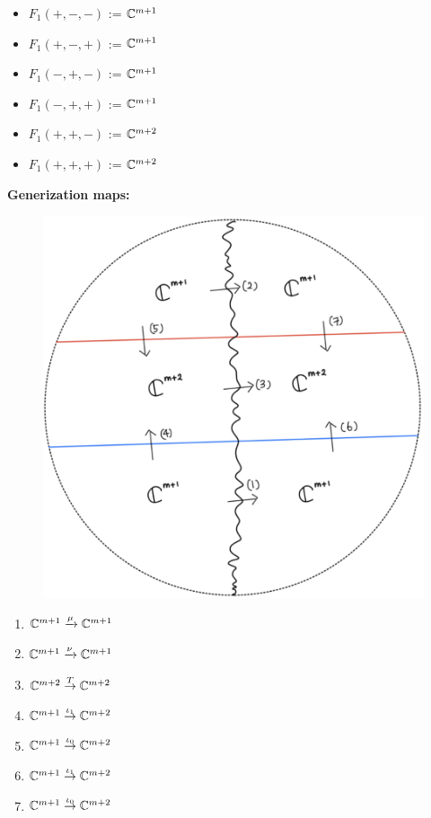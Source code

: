 \begin{itemize}
\item $F_1(+,-,-)$ := $\mathbb{C}^{m+1}$
\item $F_1(+,-,+)$ := $\mathbb{C}^{m+1}$
\item $F_1(-,+,-)$ := $\mathbb{C}^{m+1}$
\item $F_1(-,+,+)$ := $\mathbb{C}^{m+1}$
\item $F_1(+,+,-)$ := $\mathbb{C}^{m+2}$
\item $F_1(+,+,+)$ := $\mathbb{C}^{m+2}$
\end{itemize}

\textbf{Generization maps:}
\begin{figure}[H]
    \centering
    \includegraphics[scale = 0.45]{diagrams/lemma3/33.png} 
    \caption{}
    \label{fig:your-label}
\end{figure}
\begin{enumerate}[label = (\arabic*)]
\item $\mathbb{C}^{m+1} \xrightarrow{\mu} \mathbb{C}^{m+1}$

\item $\mathbb{C}^{m+1} \xrightarrow{\nu} \mathbb{C}^{m+1}$

\item $\mathbb{C}^{m+2} \overset{T}{\rightarrow} \mathbb{C}^{m+2}$

\item $\mathbb{C}^{m+1} \overset{\iota_1}{\rightarrow} \mathbb{C}^{m+2}$

\item $\mathbb{C}^{m+1} \overset{\iota_0}{\rightarrow} \mathbb{C}^{m+2}$

\item $\mathbb{C}^{m+1} \overset{\iota_1}{\rightarrow} \mathbb{C}^{m+2}$

\item $\mathbb{C}^{m+1} \overset{\iota_0}{\rightarrow} \mathbb{C}^{m+2}$
\end{enumerate}
